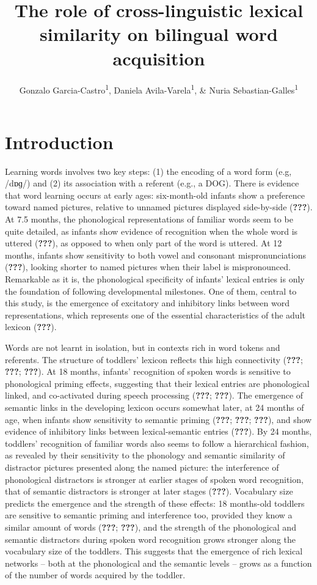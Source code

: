 \documentclass[
  english,
  man,man,floatsintext]{apa6}
\title{The role of cross-linguistic lexical similarity on bilingual word acquisition}
\author{Gonzalo Garcia-Castro\textsuperscript{1}, Daniela Avila-Varela\textsuperscript{1}, \& Nuria Sebastian-Galles\textsuperscript{1}}
\date{}
\affiliation{\vspace{0.5cm}\textsuperscript{1} Center for Brain and Cognition, Universitat Pompeu Fabra, Barcelona, Spain}
\begin{document}
\maketitle

\hypertarget{introduction}{%
\section{Introduction}\label{introduction}}

Learning words involves two key steps: (1) the encoding of a word form (e.g, /dɒɡ/)
and (2) its association with a referent (e.g., a DOG). There is evidence that word learning occurs at early ages: six-month-old infants show a preference toward named pictures, relative to unnamed pictures displayed side-by-side ({\textbf{???}}). At 7.5 months, the phonological representations of familiar words seem to be quite detailed, as infants show evidence of recognition when the whole word is uttered ({\textbf{???}}), as opposed to when only part of the word is uttered. At 12 months, infants show sensitivity to both vowel and consonant mispronunciations ({\textbf{???}}), looking shorter to named pictures when their label is mispronounced. Remarkable as it is, the phonological specificity of infants' lexical entries is only the foundation of following developmental milestones. One of them, central to this study, is the emergence of excitatory and inhibitory links between word representations, which represents one of the essential characteristics of the adult lexicon ({\textbf{???}}).

Words are not learnt in isolation, but in contexts rich in word tokens and referents. The structure of toddlers' lexicon reflects this high connectivity ({\textbf{???}}; {\textbf{???}}; {\textbf{???}}). At 18 months, infants' recognition of spoken words is sensitive to phonological priming effects, suggesting that their lexical entries are phonological linked, and co-activated during speech processing ({\textbf{???}}; {\textbf{???}}). The emergence of semantic links in the developing lexicon occurs somewhat later, at 24 months of age, when infants show sensitivity to semantic priming ({\textbf{???}}; {\textbf{???}}; {\textbf{???}}), and show evidence of inhibitory links between lexical-semantic entries ({\textbf{???}}). By 24 months, toddlers' recognition of familiar words also seems to follow a hierarchical fashion, as revealed by their sensitivity to the phonology and semantic similarity of distractor pictures presented along the named picture: the interference of phonological distractors is stronger at earlier stages of spoken word recognition, that of semantic distractors is stronger at later stages ({\textbf{???}}). Vocabulary size predicts the emergence and the strength of these effects: 18 months-old toddlers are sensitive to semantic priming and interference too, provided they know a similar amount of words ({\textbf{???}}; {\textbf{???}}), and the strength of the phonological and semantic distractors during spoken word recognition grows stronger along the vocabulary size of the toddlers. This suggests that the emergence of rich lexical networks -- both at the phonological and the semantic levels -- grows as a function of the number of words acquired by the toddler.
\end{document}
